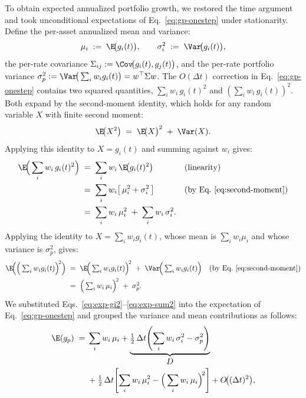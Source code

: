 To obtain expected annualized portfolio growth, we restored the time
argument and took unconditional expectations of
Eq.~\eqref{eq:gp-onestep} under stationarity. Define the
per-asset annualized mean and variance:
\begin{equation}
  \mu_i \;:=\; \E\!\big(g_i(t)\big), \qquad
  \sigma_i^2 \;:=\; \Var\!\big(g_i(t)\big),
\end{equation}
the per-rate covariance
$\Sigma_{ij} := \Cov\!\big(g_i(t), g_j(t)\big)$, and the per-rate
portfolio variance
$\sigma_p^2 := \Var\!\big(\textstyle\sum_i w_i g_i(t)\big) =
w^\top \Sigma w$. The $O(\Delta t)$ correction in
Eq.~\eqref{eq:gp-onestep} contains two squared quantities,
$\sum_i w_i\, g_i(t)^2$ and $(\sum_i w_i\, g_i(t))^2$. Both expand
by the second-moment identity, which holds for any random variable
$X$ with finite second moment:
\begin{equation}
  \E\!\big(X^2\big) \;=\; \E\!\big(X\big)^2 \;+\; \Var(X).
  \label{eq:second-moment}
\end{equation}
Applying this identity to $X = g_i(t)$ and summing against $w_i$ gives:
\begin{align}
  \E\!\Big(\sum_{i} w_i\, g_i(t)^2\Big)
   &\;=\; \sum_{i} w_i\, \E\!\big(g_i(t)^2\big)
       && \text{(linearity)} \notag \\
   &\;=\; \sum_{i} w_i\!\left[\,\mu_i^2 + \sigma_i^2\,\right]
       && \text{(by Eq.~\eqref{eq:second-moment})} \notag \\
   &\;=\; \sum_{i} w_i\, \mu_i^2 \;+\; \sum_{i} w_i\, \sigma_i^2.
   \label{eq:exp-gi2}
\end{align}
Applying the identity to $X = \sum_i w_i g_i(t)$, whose mean is
$\sum_i w_i\mu_i$ and whose variance is $\sigma_p^2$, gives:
\begin{align}
  \E\!\Big(\Big(\textstyle\sum_{i} w_i g_i(t)\Big)^{\!2}\Big)
   &\;=\; \E\!\Big(\textstyle\sum_{i} w_i g_i(t)\Big)^{\!2}
       \;+\; \Var\!\Big(\textstyle\sum_{i} w_i g_i(t)\Big)
       && \text{(by Eq.~\eqref{eq:second-moment})} \notag \\
   &\;=\; \Big(\textstyle\sum_{i} w_i\, \mu_i\Big)^{\!2}
       \;+\; \sigma_p^2.
   \label{eq:exp-sum2}
\end{align}
We substituted Eqs.~\eqref{eq:exp-gi2}--\eqref{eq:exp-sum2} into the
expectation of Eq.~\eqref{eq:gp-onestep} and grouped the variance and
mean contributions as follows:
\begin{equation}
\begin{aligned}
  \E(g_p) \;={}& \sum_{i} w_i\, \mu_i
  + \underbrace{\tfrac{1}{2}\,\Delta t\!\left(\sum_{i} w_i\, \sigma_i^2
       - \sigma_p^2\right)}_{\displaystyle D} \\
  &+ \tfrac{1}{2}\,\Delta t\!\left[\sum_{i} w_i\, \mu_i^2
       - \Big(\sum_{i} w_i\, \mu_i\Big)^{\!2}\right]
  + O\!\big((\Delta t)^2\big),
\end{aligned}
  \label{eq:booth-fama}
\end{equation}
